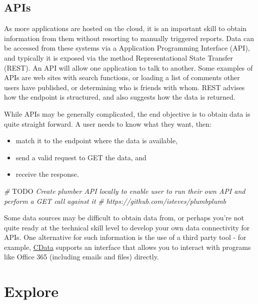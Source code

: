 \documentclass[
]{book}
\newenvironment{Shaded}{\begin{snugshade}}{\end{snugshade}}
\newcommand{\AlertTok}[1]{\textcolor[rgb]{0.94,0.16,0.16}{#1}}
\newcommand{\CommentTok}[1]{\textcolor[rgb]{0.56,0.35,0.01}{\textit{#1}}}
\providecommand{\tightlist}{%
  \setlength{\itemsep}{0pt}\setlength{\parskip}{0pt}}
\begin{document}
\hypertarget{apis}{%
\section{APIs}\label{apis}}

As more applications are hosted on the cloud, it is an important skill to obtain information from them without resorting to manually triggered reports. Data can be accessed from these systems via a Application Programming Interface (API), and typically it is exposed via the method Representational State Transfer (REST). An API will allow one application to talk to another. Some examples of APIs are web sites with search functions, or loading a list of comments other users have published, or determining who is friends with whom. REST advises how the endpoint is structured, and also suggests how the data is returned.

While APIs may be generally complicated, the end objective is to obtain data is quite straight forward. A user needs to know what they want, then:

\begin{itemize}
\tightlist
\item
  match it to the endpoint where the data is available,
\item
  send a valid request to GET the data, and
\item
  receive the response.
\end{itemize}

\begin{Shaded}
\begin{Highlighting}[]
\CommentTok{# }\AlertTok{TODO}\CommentTok{ Create plumber API locally to enable user to run their own API and perform a GET call against it}
\CommentTok{# https://github.com/isteves/plumbplumb}
\end{Highlighting}
\end{Shaded}

Some data sources may be difficult to obtain data from, or perhaps you're not quite ready at the technical skill level to develop your own data connectivity for APIs. One alternative for such information is the use of a third party tool - for example, \href{https://www.cdata.com/kb/tech/office365-jdbc-r.rst}{CData} supports an interface that allows you to interact with programs like Office 365 (including emails and files) directly.

\hypertarget{explore}{%
\chapter{Explore}\label{explore}}
\end{document}
